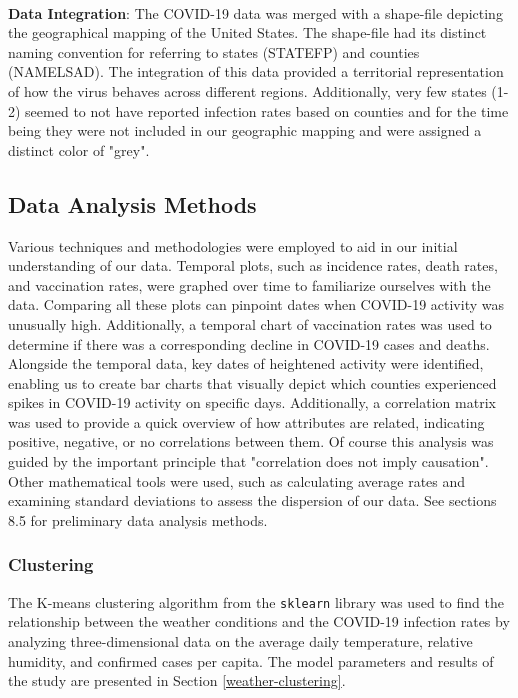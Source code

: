 \documentclass[sigconf,screen,nonacm]{acmart}
\begin{document}
\\
\textbf{Data Integration}: The COVID-19 data was merged with a shape-file depicting the geographical mapping of the United States. The shape-file had its distinct naming convention for referring to states (STATEFP) and counties (NAMELSAD). The integration of this data provided a territorial representation of how the virus behaves across different regions. Additionally, very few states (1-2) seemed to not have reported infection rates based on counties and for the time being they were not included in our geographic mapping and were assigned a distinct color of "grey".\\



\subsection{Data Analysis Methods}
Various techniques and methodologies were employed to aid in our initial understanding of our data. Temporal plots, such as incidence rates, death rates, and vaccination rates, were graphed over time to familiarize ourselves with the data. Comparing all these plots can pinpoint dates when COVID-19 activity was unusually high. Additionally, a temporal chart of vaccination rates was used to determine if there was a corresponding decline in COVID-19 cases and deaths. Alongside the temporal data, key dates of heightened activity were identified, enabling us to create bar charts that visually depict which counties experienced spikes in COVID-19 activity on specific days. Additionally, a correlation matrix was used to provide a quick overview of how attributes are related, indicating positive, negative, or no correlations between them. Of course this analysis was guided by the important principle that "correlation does not imply causation". Other mathematical tools were used, such as calculating average rates and examining standard deviations to assess the dispersion of our data. See sections 8.5 for preliminary data analysis methods.  \\

\subsubsection{Clustering}
The K-means clustering algorithm from the \texttt{sklearn} library was used to find the relationship between the weather conditions and the COVID-19 infection rates by analyzing three-dimensional data on the average daily temperature, relative humidity, and confirmed cases per capita. The model parameters and results of the study are presented in Section \ref{weather-clustering}. 
\end{document}
